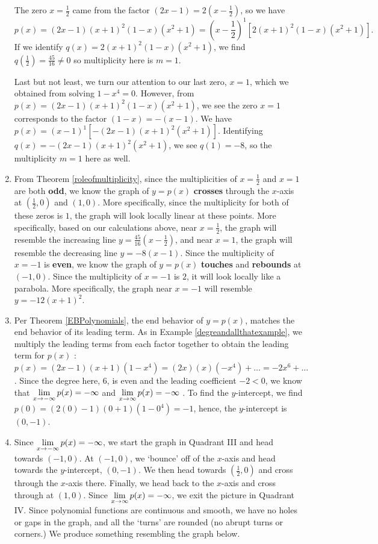 \documentclass{ximera}
\begin{document}
\begin{example}
\begin{enumerate}
The zero $x = \frac{1}{2}$ came from the factor $(2x-1) = 2 (x-\frac{1}{2})$, so we have \[ p(x) =  (2x-1)(x+1)^2(1-x)(x^2+1)  = (x -\frac{1}{2})^{1} \left[2 (x+1)^2(1-x)(x^2+1) \right]. \] If we identify $q(x) = 2 (x+1)^2(1-x)(x^2+1)$, we find $q(\frac{1}{2}) = \frac{45}{16} \neq 0$ so multiplicity here is $m=1$.  

Last but not least, we turn our attention to our last zero, $x = 1$, which we obtained from solving $1-x^4=0$.  However, from $p(x) =  (2x-1)(x+1)^2(1-x)(x^2+1)$, we see the zero $x=1$ corresponds to the factor $(1-x) = -(x-1)$.  We have $p(x) = (x-1)^{1}\left[- (2x-1)(x+1)^2(x^2+1)\right]$.  Identifying $q(x) = - (2x-1)(x+1)^2(x^2+1)$, we see $q(1) = -8$, so the multiplicity $m = 1$ here as well.  


\item  From Theorem \ref{roleofmultiplicity}, since the multiplicities of $x = \frac{1}{2}$ and $x = 1$ are both \textbf{odd}, we know the graph of $y = p(x)$ \textbf{crosses} through the $x$-axis at $(\frac{1}{2}, 0)$ and $(1,0)$. More specifically, since the multiplicity for both of these zeros is $1$,  the graph will look locally linear at these points. More specifically, based on our calculations above, near $x = \frac{1}{2}$, the graph will resemble the increasing line $y =  \frac{45}{16} (x - \frac{1}{2})$, and near  $x = 1$, the graph will resemble the decreasing line $y = -8(x-1)$.    Since the multiplicity of $x = -1$ is \textbf{even}, we know the graph of $y = p(x)$ \textbf{touches} and  \textbf{rebounds} at $(-1,0)$.   Since the multiplicity of $x=-1$ is $2$, it will look locally like a parabola.   More specifically, the graph near $x = -1$ will resemble $y = -12(x+1)^2$.

\item  Per Theorem \ref{EBPolynomials}, the end behavior of $y =p(x)$, matches the end behavior of its leading term.  As in Example \ref{degreandallthatexample}, we multiply the leading terms from each factor together to obtain the leading term for $p(x)$ :   $p(x) = (2x-1)(x+1)(1-x^4) = (2x)(x)(-x^4) + \ldots = -2x^6 + \ldots$.  Since the degree here, $6$, is even and the leading coefficient $-2 <0$, we know that $\ds{\lim_{x \rightarrow - \infty} p(x) =  -\infty}$ and $\ds{\lim_{x \rightarrow  \infty} p(x) =  -\infty}$ .  To find the $y$-intercept, we find $p(0) = (2(0)-1)(0+1)(1-0^4) = -1$, hence, the $y$-intercept is $(0,-1)$.  

\item  Since  $\ds{\lim_{x \rightarrow - \infty} p(x) =  -\infty}$,  we start the graph in Quadrant III and head towards $(-1,0)$. At $(-1,0)$, we `bounce' off of the $x$-axis and head towards the $y$-intercept, $(0,-1)$.  We then head towards $\left(\frac{1}{2}, 0 \right)$ and cross through the $x$-axis there.  Finally, we head back to the $x$-axis and cross through at $(1,0)$.  Since $\ds{\lim_{x \rightarrow  \infty} p(x) =  -\infty}$,  we exit the picture in Quadrant IV.  Since polynomial functions are continuous and smooth, we have no holes or gaps in the graph, and all the `turns' are rounded (no abrupt turns or corners.)  We produce something resembling the graph below.


\end{enumerate}
\end{example}
\end{document}
